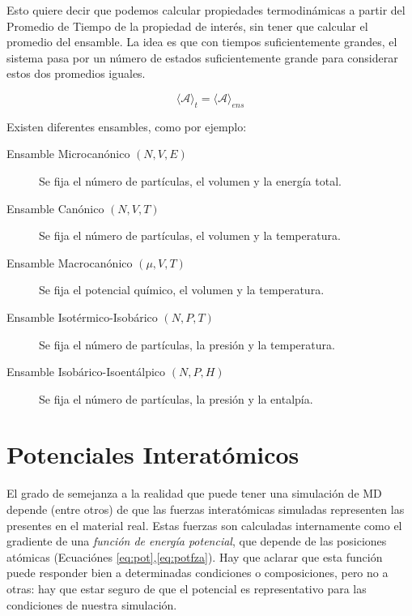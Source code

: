Esto quiere decir que podemos calcular propiedades termodinámicas a partir del Promedio de Tiempo de la propiedad de interés, sin tener que calcular el promedio del ensamble. La idea es que con tiempos suficientemente grandes, el sistema pasa por un número de estados suficientemente grande para considerar estos dos promedios iguales.

\begin{equation}
\langle \mathbf{\mathcal{A}} \rangle _{t} = \langle \mathbf{\mathcal{A}} \rangle _{ens}
\end{equation}

Existen diferentes ensambles, como por ejemplo:

\begin{description}
	\item[Ensamble Microcanónico $(N,V,E)$] Se fija el número de partículas, el volumen y la energía total.
	\item[Ensamble Canónico $(N,V,T)$] Se fija el número de partículas, el volumen y la temperatura.
	\item[Ensamble Macrocanónico $(\mu,V,T)$] Se fija el potencial químico, el volumen y la temperatura.
	\item[Ensamble Isotérmico-Isobárico $(N,P,T)$] Se fija el número de partículas, la presión y la temperatura.
	\item[Ensamble Isobárico-Isoentálpico $(N,P,H)$] Se fija el número de partículas, la presión y la entalpía.
\end{description}

\section{Potenciales Interatómicos}
\label{S2_3}

El grado de semejanza a la realidad que puede tener una simulación de MD depende (entre otros) de que las fuerzas interatómicas simuladas representen las presentes en el material real. Estas fuerzas son calculadas internamente como el gradiente de una \textit{función de energía potencial}, que depende de las posiciones atómicas (Ecuaciónes \ref{eq:pot},\ref{eq:potfza}). Hay que aclarar que esta función puede responder bien a determinadas condiciones o composiciones, pero no a otras: hay que estar seguro de que el potencial es representativo para las condiciones de nuestra simulación.

